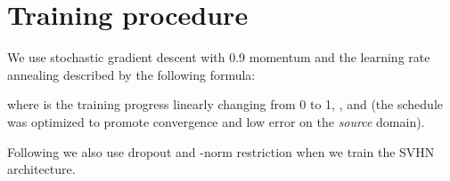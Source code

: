 \documentclass{article}
\begin{document}
\section{Training procedure}
\label{sect:appendix_training}

We use stochastic gradient descent with 0.9 momentum and the learning rate annealing described by the following formula:

where  is the training progress linearly changing from 0 to 1, ,  and  (the schedule was optimized to promote convergence and low error on the \emph{source} domain).

Following \cite{Srivastava14} we also use dropout and -norm restriction when we train the SVHN architecture.







 
\newpage


\end{document}

